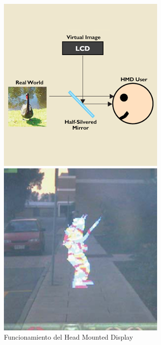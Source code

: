 \begin{figure}[ht]
    \centering
    \begin{minipage}{0.32\textwidth}
        \centering
        \includegraphics[width=\linewidth]{Images/ARQuake_HIW.png}
        \caption{Funcionamiento del Head Mounted Display}
    \label{fig:HIWARQuake}
    \end{minipage}\hfill
    \begin{minipage}{0.32\textwidth}
        \centering
        \includegraphics[width=\linewidth]{Images/ARQuake_Example.png}

\end{minipage}
\end{figure}
